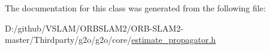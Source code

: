 The documentation for this class was generated from the following file\+:\begin{DoxyCompactItemize}
\item 
D\+:/github/\+V\+S\+L\+A\+M/\+O\+R\+B\+S\+L\+A\+M2/\+O\+R\+B-\/\+S\+L\+A\+M2-\/master/\+Thirdparty/g2o/g2o/core/\mbox{\hyperlink{estimate__propagator_8h}{estimate\+\_\+propagator.\+h}}\end{DoxyCompactItemize}
